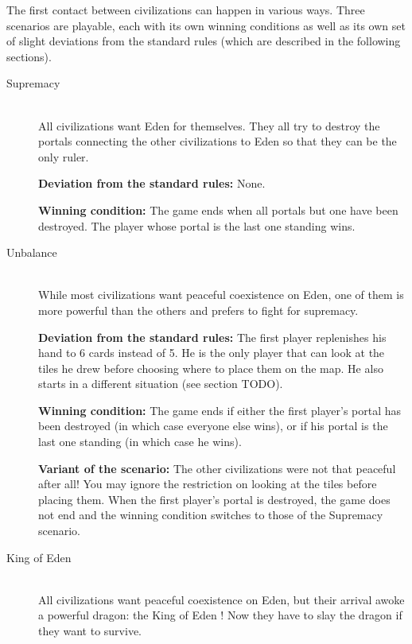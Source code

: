 \documentclass[a4paper]{article}
\begin{document}
   The first contact between civilizations can happen in various ways.
   Three scenarios are playable, each with its own winning conditions
   as well as its own set of slight deviations from the standard rules
   (which are described in the following sections).
   
    \begin{description}
        \item[Supremacy] \hfill \\
            All civilizations want Eden for themselves.
            They all try to destroy the portals connecting the other civilizations to Eden
            so that they can be the only ruler.
            
            \textbf{Deviation from the standard rules:}
            None.
            
            \textbf{Winning condition:}
            The game ends when all portals but one have been destroyed.
            The player whose portal is the last one standing wins.


        \item[Unbalance] \hfill \\
            While most civilizations want peaceful coexistence on Eden,
            one of them is more powerful than the others
            and prefers to fight for supremacy.
            
            \textbf{Deviation from the standard rules:}
            The first player replenishes his hand to 6 cards instead of 5.
            He is the only player that can look at the tiles he drew before choosing
            where to place them on the map.
            He also starts in a different situation (see section TODO).
            
            \textbf{Winning condition:}
            The game ends if either the first player's portal has been destroyed
            (in which case everyone else wins),
            or if his portal is the last one standing (in which case he wins).
            
            \textbf{Variant of the scenario:}
            The other civilizations were not that peaceful after all!
            You may ignore the restriction on looking at the tiles before placing them.
            When the first player's portal is destroyed,
            the game does not end and the winning condition switches to those
            of the Supremacy scenario.
            


        \item[King of Eden] \hfill \\
            All civilizations want peaceful coexistence on Eden,
            but their arrival awoke a powerful dragon: the King of Eden !
            Now they have to slay the dragon if they want to survive.
            

\end{description}
\end{document}

